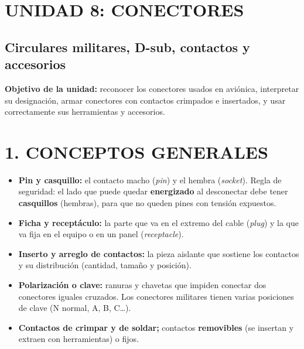 \clearpage
\section*{UNIDAD 8: CONECTORES}
\subsection*{Circulares militares, D-sub, contactos y accesorios}

\begin{recuadro}
\textbf{Objetivo de la unidad:} reconocer los conectores usados en aviónica, interpretar su
designación, armar conectores con contactos crimpados e insertados, y usar correctamente sus
herramientas y accesorios.
\end{recuadro}

\section*{1. CONCEPTOS GENERALES}

\begin{itemize}
  \item \textbf{Pin y casquillo:} el contacto macho (\textit{pin}) y el hembra (\textit{socket}).
        Regla de seguridad: el lado que puede quedar \textbf{energizado} al desconectar debe tener
        \textbf{casquillos} (hembras), para que no queden pines con tensión expuestos.
  \item \textbf{Ficha y receptáculo:} la parte que va en el extremo del cable (\textit{plug}) y la
        que va fija en el equipo o en un panel (\textit{receptacle}).
  \item \textbf{Inserto y arreglo de contactos:} la pieza aislante que sostiene los contactos y su
        distribución (cantidad, tamaño y posición).
  \item \textbf{Polarización o clave:} ranuras y chavetas que impiden conectar dos conectores
        iguales cruzados. Los conectores militares tienen varias posiciones de clave (N normal, A,
        B, C\ldots).
  \item \textbf{Contactos de crimpar y de soldar;} contactos \textbf{removibles} (se insertan y
        extraen con herramientas) o fijos.
\end{itemize}

